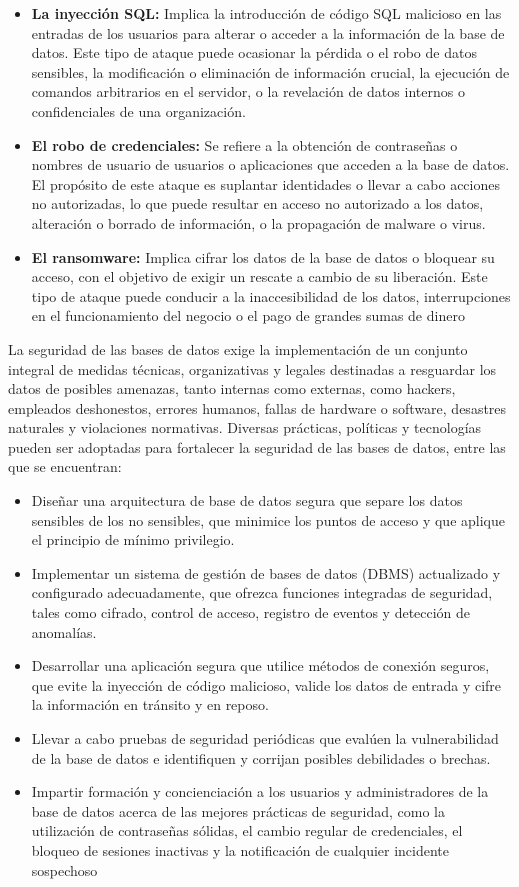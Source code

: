\documentclass[11pt]{report}
\begin{document}
\begin{itemize}
\item \textbf{La inyección SQL:} Implica la introducción de código SQL malicioso en las entradas
de los usuarios para alterar o acceder a la información de la base de datos. Este tipo
de ataque puede ocasionar la pérdida o el robo de datos sensibles, la modificación o
eliminación de información crucial, la ejecución de comandos arbitrarios en el
servidor, o la revelación de datos internos o confidenciales de una organización.
\item \textbf{El robo de credenciales:} Se refiere a la obtención de contraseñas o nombres de
usuario de usuarios o aplicaciones que acceden a la base de datos. El propósito de
este ataque es suplantar identidades o llevar a cabo acciones no autorizadas, lo que
puede resultar en acceso no autorizado a los datos, alteración o borrado de
información, o la propagación de malware o virus.
\item \textbf{El ransomware:} Implica cifrar los datos de la base de datos o bloquear su acceso,
con el objetivo de exigir un rescate a cambio de su liberación. Este tipo de ataque
puede conducir a la inaccesibilidad de los datos, interrupciones en el funcionamiento
del negocio o el pago de grandes sumas de dinero
\end{itemize}

La seguridad de las bases de datos exige la implementación de un conjunto integral de
medidas técnicas, organizativas y legales destinadas a resguardar los datos de posibles
amenazas, tanto internas como externas, como hackers, empleados deshonestos, errores
humanos, fallas de hardware o software, desastres naturales y violaciones normativas.
Diversas prácticas, políticas y tecnologías pueden ser adoptadas para fortalecer la
seguridad de las bases de datos, entre las que se encuentran:
\begin{itemize}
  \item Diseñar una arquitectura de base de datos segura que separe los datos sensibles de
  los no sensibles, que minimice los puntos de acceso y que aplique el principio de
  mínimo privilegio.
  \item Implementar un sistema de gestión de bases de datos (DBMS) actualizado y
  configurado adecuadamente, que ofrezca funciones integradas de seguridad, tales
  como cifrado, control de acceso, registro de eventos y detección de anomalías.
  \item Desarrollar una aplicación segura que utilice métodos de conexión seguros, que
  evite la inyección de código malicioso, valide los datos de entrada y cifre la
  información en tránsito y en reposo.
  \item Llevar a cabo pruebas de seguridad periódicas que evalúen la vulnerabilidad de la
  base de datos e identifiquen y corrijan posibles debilidades o brechas.
  \item Impartir formación y concienciación a los usuarios y administradores de la base de
  datos acerca de las mejores prácticas de seguridad, como la utilización de
  contraseñas sólidas, el cambio regular de credenciales, el bloqueo de sesiones
  inactivas y la notificación de cualquier incidente sospechoso
\end{itemize}
\end{document}
